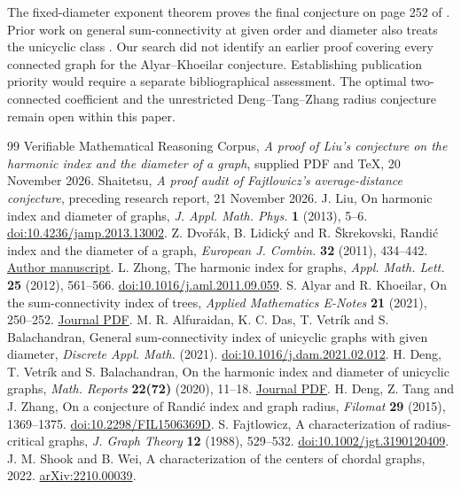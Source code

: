 \documentclass[11pt,a4paper]{article}
\begin{document}
The fixed-diameter exponent theorem proves the final conjecture on page 252 of \cite{alyar}. Prior work on general sum-connectivity at given order and diameter also treats the unicyclic class \cite{unicyclic-sum}. Our search did not identify an earlier proof covering every connected graph for the Alyar--Khoeilar conjecture. Establishing publication priority would require a separate bibliographical assessment. The optimal two-connected coefficient and the unrestricted Deng--Tang--Zhang radius conjecture remain open within this paper.
\clearpage
\begin{thebibliography}{99}\small
{} Verifiable Mathematical Reasoning Corpus, \emph{A proof of Liu's conjecture on the harmonic index and the diameter of a graph}, supplied PDF and TeX, 20 November 2026.
 Shaitetsu, \emph{A proof audit of Fajtlowicz's average-distance conjecture}, preceding research report, 21 November 2026.
 J. Liu, On harmonic index and diameter of graphs, \emph{J. Appl. Math. Phys.} \textbf{1} (2013), 5--6. \href{https://doi.org/10.4236/jamp.2013.13002}{doi:10.4236/jamp.2013.13002}.
 Z. Dvo\v r\'ak, B. Lidick\'y and R. \v Skrekovski, Randi\'c index and the diameter of a graph, \emph{European J. Combin.} \textbf{32} (2011), 434--442. \href{https://kam.mff.cuni.cz/~bernard/pub/index.pdf}{Author manuscript}.
 L. Zhong, The harmonic index for graphs, \emph{Appl. Math. Lett.} \textbf{25} (2012), 561--566. \href{https://doi.org/10.1016/j.aml.2011.09.059}{doi:10.1016/j.aml.2011.09.059}.
 S. Alyar and R. Khoeilar, On the sum-connectivity index of trees, \emph{Applied Mathematics E-Notes} \textbf{21} (2021), 250--252. \href{https://www.math.nthu.edu.tw/~amen/2021/AMEN-200425.pdf}{Journal PDF}.
 M. R. Alfuraidan, K. C. Das, T. Vetr\'ik and S. Balachandran, General sum-connectivity index of unicyclic graphs with given diameter, \emph{Discrete Appl. Math.} (2021). \href{https://doi.org/10.1016/j.dam.2021.02.012}{doi:10.1016/j.dam.2021.02.012}.
 H. Deng, T. Vetr\'ik and S. Balachandran, On the harmonic index and diameter of unicyclic graphs, \emph{Math. Reports} \textbf{22(72)} (2020), 11--18. \href{https://imar.ro/journals/Mathematical_Reports/Pdfs/2020/1/2.pdf}{Journal PDF}.
 H. Deng, Z. Tang and J. Zhang, On a conjecture of Randi\'c index and graph radius, \emph{Filomat} \textbf{29} (2015), 1369--1375. \href{https://doi.org/10.2298/FIL1506369D}{doi:10.2298/FIL1506369D}.
 S. Fajtlowicz, A characterization of radius-critical graphs, \emph{J. Graph Theory} \textbf{12} (1988), 529--532. \href{https://doi.org/10.1002/jgt.3190120409}{doi:10.1002/jgt.3190120409}.
 J. M. Shook and B. Wei, A characterization of the centers of chordal graphs, 2022. \href{https://arxiv.org/abs/2210.00039}{arXiv:2210.00039}.
\end{thebibliography}
\end{document}
